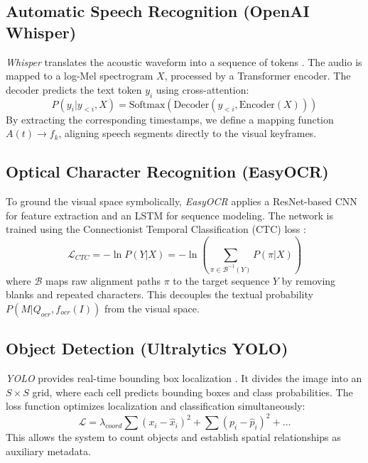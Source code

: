 \documentclass[11pt,a4paper]{article}
\begin{document}
\subsection{Automatic Speech Recognition (OpenAI Whisper)}
\textit{Whisper} translates the acoustic waveform into a sequence of tokens \cite{radford2023robust}. The audio is mapped to a log-Mel spectrogram $X$, processed by a Transformer encoder. The decoder predicts the text token $y_i$ using cross-attention:
\begin{equation}
P(y_i | y_{<i}, X) = \text{Softmax}\left( \text{Decoder}(y_{<i}, \text{Encoder}(X)) \right)
\end{equation}
By extracting the corresponding timestamps, we define a mapping function $A(t) \rightarrow f_k$, aligning speech segments directly to the visual keyframes.

\subsection{Optical Character Recognition (EasyOCR)}
To ground the visual space symbolically, \textit{EasyOCR} applies a ResNet-based CNN for feature extraction and an LSTM for sequence modeling. The network is trained using the Connectionist Temporal Classification (CTC) loss \cite{graves2006connectionist}:
\begin{equation}
\mathcal{L}_{CTC} = -\ln P(Y|X) = -\ln \left( \sum_{\pi \in \mathcal{B}^{-1}(Y)} P(\pi|X) \right)
\end{equation}
where $\mathcal{B}$ maps raw alignment paths $\pi$ to the target sequence $Y$ by removing blanks and repeated characters. This decouples the textual probability $P(M|Q_{ocr}, f_{ocr}(I))$ from the visual space.

\subsection{Object Detection (Ultralytics YOLO)}
\textit{YOLO} provides real-time bounding box localization \cite{redmon2016you}. It divides the image into an $S \times S$ grid, where each cell predicts bounding boxes and class probabilities. The loss function optimizes localization and classification simultaneously:
\begin{equation}
\mathcal{L} = \lambda_{coord} \sum (x_i - \hat{x}_i)^2 + \sum (p_i - \hat{p}_i)^2 + \dots
\end{equation}
This allows the system to count objects and establish spatial relationships as auxiliary metadata.
\end{document}
